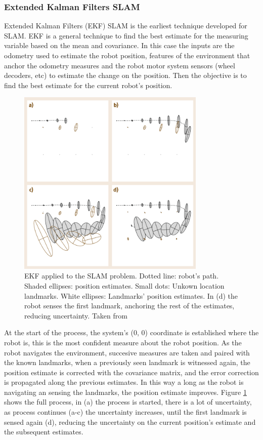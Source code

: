     \subsubsection{Extended Kalman Filters SLAM} \label{ch_3:sect:localization:ekf}

      Extended Kalman Filters (EKF) SLAM is the earliest technique developed for SLAM. EKF is a general technique to find the best estimate for the measuring variable based on the mean and covariance. In this case the inputs are the odometry used to estimate the robot position, features of the environment that anchor the odometry measures and the robot motor system sensors (wheel decoders, etc) to estimate the change on the position. Then the objective is to find the best estimate for the current robot's position.

      \begin{figure}[!h]
        \centering
        \includegraphics[width=0.8\textwidth]{./Figures/slam_ekf_model.png}
        \caption{EKF applied to the SLAM problem. Dotted line: robot's path. Shaded ellipses: position estimates. Small dots: Unkown location landmarks. White ellipses: Landmarks' position estimates. In (d) the robot senses the first landmark, anchoring the rest of the estimates, reducing uncertainty. Taken from \cite{inbookhandbook}}
        \label{ch_3:fig:ekf_slam}
      \end{figure}

      At the start of the process, the system's ($0$, $0$) coordinate is established where the robot is, this is the most confident measure about the robot position. As the robot navigates the environment, succesive measures are taken and paired with the known landmarks, when a previously seen landmark is witnessed again, the position estimate is corrected with the covariance matrix, and the error correction is propagated along the previous estimates. In this way a long as the robot is navigating an sensing the landmarks, the position estimate improves. Figure \ref{ch_3:fig:ekf_slam} shows the full process, in (a) the process is started, there is a lot of uncertainty, as process continues (a-c) the uncertainty increases, until the first landmark is sensed again (d), reducing the uncertainty on the current position's estimate and the subsequent estimates.

